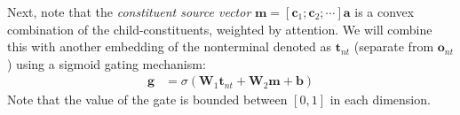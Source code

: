 \documentclass[11pt]{article}
\begin{document}


Next, note that the \emph{constituent source vector} $\mathbf{m} = [\mathbf{c}_1 ; \mathbf{c}_2; \cdots ] \mathbf{a}$ is a convex combination of the child-constituents, weighted by attention.  We will combine this with another embedding of the nonterminal denoted as $\mathbf{t}_{\mathit{nt}}$ (separate from $\mathbf{o}_{\mathit{nt}}$) using a sigmoid gating mechanism:
\begin{align}
\mathbf{g} & = \sigma \left( \mathbf{W}_1 \mathbf{t}_{\mathit{nt}} + \mathbf{W}_2 \mathbf{m} + \mathbf{b} \right)
\end{align}
Note that the value of the gate is bounded between $\left[0, 1 \right]$ in each dimension.
\end{document}
